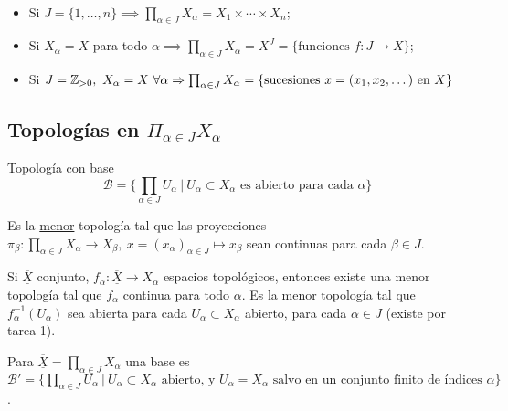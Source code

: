 \documentclass[a4paper]{report}
\begin{document}
\begin{eg}~
	\begin{itemize}
		\item Si $J = \{1,\dots,n\} \implies \prod_{\alpha\in J} X_{\alpha} = X_1 \times \cdots \times X_n$;

		\item Si $X_{\alpha} = X$ para todo $\alpha \implies \prod_{\alpha \in J} X_{\alpha} = X^J = \{ \text{funciones } f:J\to X\}$;

		\item Si $J= \Z_{>0},\ X_{\alpha}=X\ \forall \alpha \implies \prod_{\alpha\in J} X_{\alpha} = \{\text{sucesiones } x=(x_1,x_2,\dots) \text{ en } X \}$ 
	\end{itemize}
\end{eg}

\subsection{Topologías en $\Pi_{\alpha\in J} X_{\alpha}$}

\begin{definition}
	Topología con base 
	\[ \mathcal{B} = \{ \prod_{\alpha\in J} U_{\alpha} \ | \ U_{\alpha} \subset X_{\alpha} \text{ es abierto para cada } \alpha \} \]
\end{definition}

\begin{definition}
	Es la \underline{menor} topología tal que las proyecciones $\pi_{\beta}: \prod_{\alpha \in J} X_{\alpha} \to X_{\beta},\ x=(x_{\alpha})_{\alpha\in J} \mapsto x_{\beta}$ sean continuas para cada $\beta \in J$.
\end{definition}

\begin{remark}
	Si $\underline{\overline{X}}$ conjunto, $f_{\alpha} : \underline{\overline{X}} \to X_{\alpha}$ espacios topológicos, entonces existe una menor topología tal que $f_{\alpha}$ continua para todo $\alpha$. Es la menor topología tal que $f_{\alpha}^{-1}(U_{\alpha})$ sea abierta para cada $U_{\alpha} \subset X_{\alpha}$ abierto, para cada $\alpha \in J$ (existe por tarea 1).
\end{remark}

\begin{remark}
	Para $\underline{\overline{X}} = \prod_{\alpha \in J} X_{\alpha}$ una base es $\mathcal{B}' = \{ \prod_{\alpha\in J} U_{\alpha} \ | \ U_{\alpha} \subset X_{\alpha} \text{ abierto, y } U_{\alpha} = X_{\alpha} \text{ salvo en un conjunto finito de índices } \alpha \}$.
\end{remark}
\end{document}
